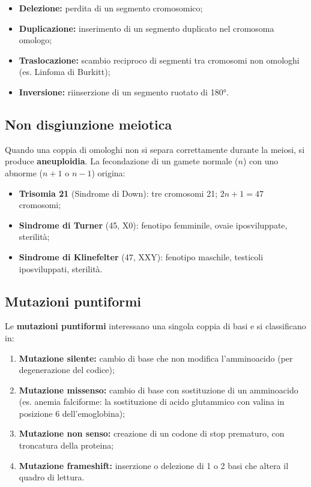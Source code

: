 \documentclass[11pt,a4paper,openright,twoside]{book}
\theoremstyle{definition}
\theoremstyle{plain}
\theoremstyle{remark}
\begin{document}
\begin{itemize}
  \item \textbf{Delezione:} perdita di un segmento cromosomico;
  \item \textbf{Duplicazione:} inserimento di un segmento duplicato nel cromosoma omologo;
  \item \textbf{Traslocazione:} scambio reciproco di segmenti tra cromosomi non omologhi (es. Linfoma di Burkitt);
  \item \textbf{Inversione:} riinserzione di un segmento ruotato di 180°.
\end{itemize}

\subsection{Non disgiunzione meiotica}

Quando una coppia di omologhi non si separa correttamente durante la meiosi, si produce \textbf{aneuploidia}. La fecondazione di un gamete normale ($n$) con uno abnorme ($n+1$ o $n-1$) origina:
\begin{itemize}
  \item \textbf{Trisomia 21} (Sindrome di Down): tre cromosomi 21; $2n+1 = 47$ cromosomi;
  \item \textbf{Sindrome di Turner} (45, X0): fenotipo femminile, ovaie iposviluppate, sterilità;
  \item \textbf{Sindrome di Klinefelter} (47, XXY): fenotipo maschile, testicoli iposviluppati, sterilità.
\end{itemize}

\subsection{Mutazioni puntiformi}

Le \textbf{mutazioni puntiformi} interessano una singola coppia di basi e si classificano in:
\begin{enumerate}
  \item \textbf{Mutazione silente:} cambio di base che non modifica l'amminoacido (per degenerazione del codice);
  \item \textbf{Mutazione missenso:} cambio di base con sostituzione di un amminoacido (es. anemia falciforme: la sostituzione di acido glutammico con valina in posizione 6 dell'emoglobina);
  \item \textbf{Mutazione non senso:} creazione di un codone di stop prematuro, con troncatura della proteina;
  \item \textbf{Mutazione frameshift:} inserzione o delezione di 1 o 2 basi che altera il quadro di lettura.
\end{enumerate}
\end{document}
